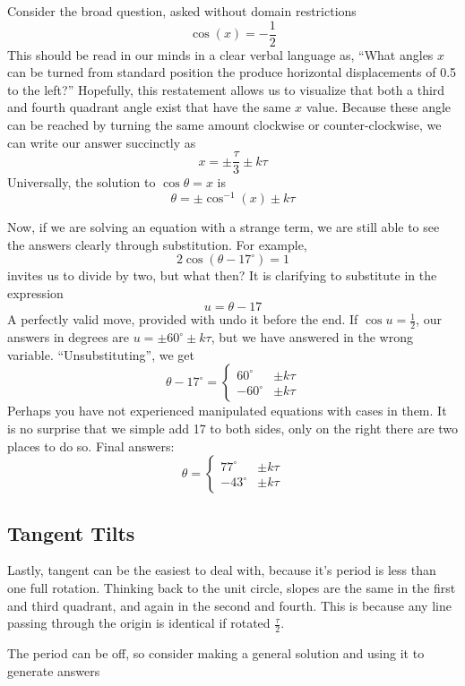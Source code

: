 Consider the broad question, asked without domain restrictions
\begin{equation}
\cos(x) = -\frac{1}{2}
\end{equation}
This should be read in our minds in a clear verbal language as, ``What angles $x$ can be
turned from standard position the produce horizontal displacements of 0.5 to the left?''
Hopefully, this restatement allows us to visualize that both a third and fourth
quadrant angle exist that have the same $x$ value.  Because these angle can be reached by
turning the same amount clockwise or counter-clockwise, we can write our answer
succinctly as 
$$
x= \pm\frac{\tau}{3} \pm k\tau
$$
Universally, the solution to $\cos\theta = x$ is
\begin{equation}
\theta = \pm\cos^{-1}(x) \pm k\tau
\end{equation}

Now, if we are solving an equation with a strange term, we are still able to see the
answers clearly through substitution.  For example, 
$$
2 \cos (\theta - 17^\circ) = 1
$$
invites us to divide by two, but what then?  It is clarifying to substitute in the expression
\begin{equation}
u = \theta - 17
\end{equation}
A perfectly valid move, provided with undo it before the end.  If $\cos u = \frac{1}{2}$, our
answers in degrees are $u = \pm60^\circ \pm k\tau$, but we have answered in the wrong
variable.  ``Unsubstituting'', we get
\begin{equation}
\theta - 17^\circ = \begin{cases} 60^\circ & \pm k\tau \\ -60^\circ & \pm k\tau \end{cases}
\end{equation}
Perhaps you have not experienced manipulated equations with cases in them.  It is no
surprise that we simple add 17 to both sides, only on the right there are two places to do so.
Final answers:
$$
\theta = \begin{cases} 77^\circ & \pm k\tau \\ -43^\circ & \pm k\tau \end{cases}
$$

\subsection{Tangent Tilts}
Lastly, tangent can be the easiest to deal with, because it's period is less than one
full rotation.  Thinking back to the unit circle, slopes are the same in the first and third
quadrant, and again in the second and fourth.  This is because any line passing through
the origin is identical if rotated $\frac{\tau}{2}$.  

\begin{example}
	\exProblem

	\exSolution
\end{example}


The period can be off, so consider making a general solution and using it to generate answers

